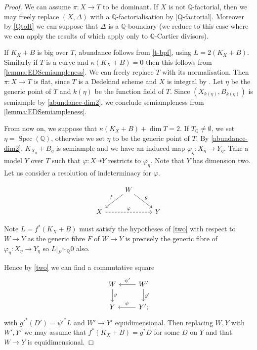 \documentclass[a4paper,12pt]{book}
\DeclareMathOperator{\Spec}{Spec}
\begin{document}
	\begin{proof}
		We can assume $\pi:X \to T$ to be dominant.
		If $X$ is not $\mathbb{Q}$-factorial, then we may freely replace $(X,\Delta)$ with a $\mathbb{Q}$-factorialisation by \autoref{Q-factorial}. Moreover by \autoref{QtoR} we can suppose that $\Delta$ is a $\mathbb{Q}$-boundary (we reduce to this case where we can apply the results of \cite{witaszek2020keels} which apply only to $\mathbb{Q}$-Cartier divisors).
		
		If $K_{X}+B$ is big over $T$, abundance follows from \autoref{t-bpf}, using $L=2(K_{X}+B)$. Similarly if $T$ is a curve and $\kappa(K_{X}+B)=0$ then this follows from \autoref{lemma:EDSemiampleness}. We can freely replace $T$ with its normalisation. Then $\pi \colon X \to T$ is flat, since $T$ is a Dedekind scheme and $X$ is integral by \cite[Proposition 9.7]{Ha77}. Let $\eta$ be the generic point of $T$ and $k(\eta)$ be the function field of $T$. Since $(X_{k(\eta)}, B_{k(\eta)})$ is semiample by \autoref{abundance-dim2}, we conclude semiampleness from \autoref{lemma:EDSemiampleness}. 
		
		From now on, we suppose that $\kappa(K_{X}+B)+\dim T=2$.
		If $T_\mathbb{Q} \neq \emptyset$, we set $\eta=\Spec(\mathbb{Q})$, otherwise we set $\eta$ to be the generic point of $T$. 
		By \autoref{abundance-dim2},  $K_{X_\eta}+B_\eta$ is semiample and we have an induced map $\varphi_{\eta} \colon X_{\eta} \to Y_{\eta}$.
		Take a model $Y$ over $T$ such that $\varphi \colon X \dashrightarrow Y$ restricts to $\varphi_{\eta}$. Note that $Y$ has dimension two. Let us consider a resolution of indeterminacy for $\varphi$.
		
		\[\begin{tikzcd}
		& W \arrow[ld, "f"'] \arrow[rd, "g"] &   \\
		X \arrow[rr, "\varphi", dashed] &                                   & Y
		\end{tikzcd}\]
		
		Note $L=f^{*}(K_{X}+B)$ must satisfy the hypotheses of \autoref{two} with respect to $W \to Y$ as the generic fibre $F$ of $W \to Y$ is precisely the generic fibre of $\varphi_{\eta} \colon X_{\eta} \to Y_{\eta}$ so $L|_{F}\sim_{\mathbb{Q}} 0$ also. 
		
		Hence by \autoref{two} we can find a commutative square
		\[\begin{tikzcd}
		W \arrow[d, "g"]  & W' \arrow[d, "g'"] \arrow[l, "\psi'"'] \\
		Y               & Y' ;   \arrow[l, "\psi"']               
		\end{tikzcd}\] 
		with $g'^{*}(D')=\psi'^{*}L$ and $W' \to Y'$ equidimensional. Then replacing $W,Y$ with $W',Y'$ we may assume that $f^{*}(K_{X}+B)=g^{*}D$ for some $D$ on $Y$ and that $W \to Y$ is equidimensional.
		

\end{proof}
\end{document}

